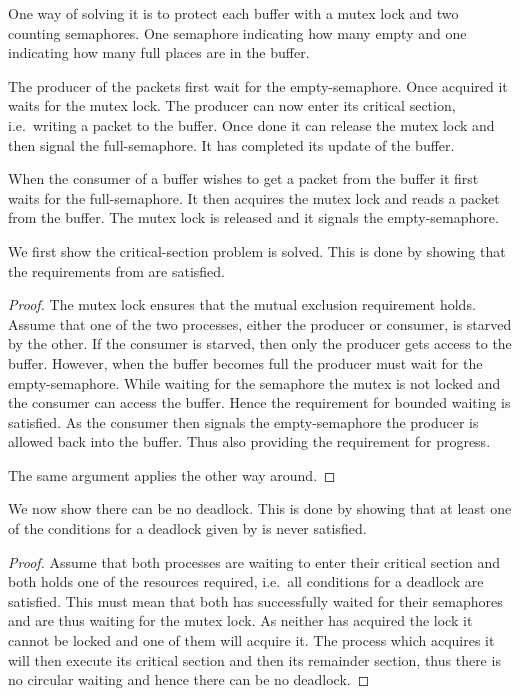 \documentclass[a4paper,nocourse]{miunasgn}
\begin{document}
\begin{questions}
\begin{solution}
		One way of solving it is to protect each buffer with a mutex lock and two 
		counting semaphores.
		One semaphore indicating how many empty and one indicating how many full 
		places are in the buffer.

		The producer of the packets first wait for the empty-semaphore.
		Once acquired it waits for the mutex lock.
		The producer can now enter its critical section, i.e.\ writing a packet to 
		the buffer.
		Once done it can release the mutex lock and then signal the full-semaphore.
		It has completed its update of the buffer.

		When the consumer of a buffer wishes to get a packet from the buffer it 
		first waits for the full-semaphore.
		It then acquires the mutex lock and reads a packet from the buffer.
		The mutex lock is released and it signals the empty-semaphore.

		We first show the critical-section problem is solved.
		This is done by showing that the requirements from \citet[p.  
		228]{Silberschatz2009osc} are satisfied.

		\begin{proof}
			The mutex lock ensures that the mutual exclusion requirement holds.
			Assume that one of the two processes, either the producer or consumer, is 
			starved by the other.
			If the consumer is starved, then only the producer gets access to the 
			buffer.
			However, when the buffer becomes full the producer must wait for the 
			empty-semaphore.
			While waiting for the semaphore the mutex is not locked and the consumer 
			can access the buffer.
			Hence the requirement for bounded waiting is satisfied.
			As the consumer then signals the empty-semaphore the producer is allowed 
			back into the buffer.
			Thus also providing the requirement for progress.
			
			The same argument applies the other way around.
		\end{proof}

		We now show there can be no deadlock.
		This is done by showing that at least one of the conditions for a deadlock 
		given by \citet[pp. 285--287]{Silberschatz2009osc} is never satisfied.

		\begin{proof}
			Assume that both processes are waiting to enter their critical section 
			and both holds one of the resources required, i.e.\ all conditions for 
			a deadlock are satisfied.
			This must mean that both has successfully waited for their semaphores and 
			are thus waiting for the mutex lock.
			As neither has acquired the lock it cannot be locked and one of them will 
			acquire it.
			The process which acquires it will then execute its critical section and 
			then its remainder section, thus there is no circular waiting and hence 
			there can be no deadlock.
		\end{proof}
	\end{solution}

\end{questions}






\end{document}
